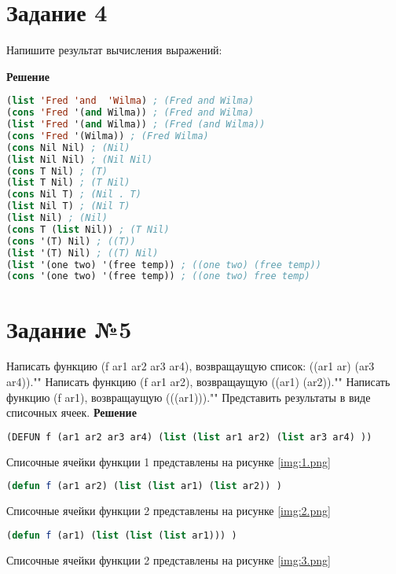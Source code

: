\section*{Задание 4}
Напишите результат вычисления выражений:

\textbf{Решение}

\begin{lstlisting}[label=second,caption=Решение задания №4, language=lisp]
(list 'Fred 'and  'Wilma) ; (Fred and Wilma)
(cons 'Fred '(and Wilma)) ; (Fred and Wilma)
(list 'Fred '(and Wilma)) ; (Fred (and Wilma))
(cons 'Fred '(Wilma)) ; (Fred Wilma)
(cons Nil Nil) ; (Nil)
(list Nil Nil) ; (Nil Nil)
(cons T Nil) ; (T)
(list T Nil) ; (T Nil)
(cons Nil T) ; (Nil . T)
(list Nil T) ; (Nil T)
(list Nil) ; (Nil)
(cons T (list Nil)) ; (T Nil)
(cons '(T) Nil) ; ((T))
(list '(T) Nil) ; ((T) Nil)
(list '(one two) '(free temp)) ; ((one two) (free temp))
(cons '(one two) '(free temp)) ; ((one two) free temp)
\end{lstlisting}

\section*{Задание №5}

\indent Написать функцию (f ar1 ar2 ar3 ar4), возвращаущую список: ((ar1 ar) (ar3 ar4)).""\newline
\indent Написать функцию (f ar1 ar2), возвращаущую ((ar1) (ar2)).""\newline
\indent Написать функцию (f ar1), возвращаущую (((ar1))).""\newline
\indent Представить результаты в виде списочных ячеек. 
\textbf{Решение}
\begin{lstlisting}[label=third,caption=Решение задания №5 (функция №1), language=lisp]
(DEFUN f (ar1 ar2 ar3 ar4) (list (list ar1 ar2) (list ar3 ar4) ))
\end{lstlisting}
Списочные ячейки функции 1 представлены на рисунке \ref{img:1.png}

\begin{lstlisting}[label=third,caption=Решение задания №5 (функция №2), language=lisp]
(defun f (ar1 ar2) (list (list ar1) (list ar2)) )
\end{lstlisting}
Списочные ячейки функции 2 представлены на рисунке \ref{img:2.png}

\begin{lstlisting}[label=third,caption=Решение задания №5 (функция №3), language=lisp]
(defun f (ar1) (list (list (list ar1))) )
\end{lstlisting}
Списочные ячейки функции 2 представлены на рисунке \ref{img:3.png}

